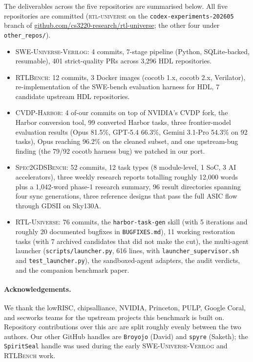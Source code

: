 \documentclass{article}
\begin{document}
The deliverables across the five repositories are summarised below. All five repositories
are committed (\textsc{rtl-universe} on the \texttt{codex-experiments-202605} branch of
\url{github.com/cs3220-research/rtl-universe}; the other four under
\texttt{other\_repos/}).

\begin{itemize}[nosep, leftmargin=*]
\item \textsc{SWE-Universe-Verilog}: 4 commits, 7-stage pipeline (Python, SQLite-backed,
resumable), 401 strict-quality PRs across 3{,}296 HDL repositories.
\item \textsc{RTLBench}: 12 commits, 3 Docker images (cocotb 1.x, cocotb 2.x, Verilator),
re-implementation of the SWE-bench evaluation harness for HDL, 7 candidate upstream HDL
repositories.
\item \textsc{CVDP-Harbor}: 4 of-our commits on top of NVIDIA's CVDP fork, the Harbor
conversion tool, 99 converted Harbor tasks, three frontier-model evaluation results
(Opus 81.5\%, GPT-5.4 66.3\%, Gemini 3.1-Pro 54.3\% on 92 tasks), Opus reaching 96.2\% on
the cleaned subset, and one upstream-bug finding (the 79/92 cocotb harness bug) we
patched in our port.
\item \textsc{Spec2GDSBench}: 52 commits, 12 task types (8 module-level, 1 SoC, 3 AI
accelerators), three weekly research reports totalling roughly 12{,}000 words plus a
1{,}042-word phase-1 research summary, 96 result directories spanning four sync
generations, three reference designs that pass the full ASIC flow through GDSII on
Sky130A.
\item \textsc{RTL-Universe}: 76 commits, the \texttt{harbor-task-gen} skill (with 5
iterations and roughly 20 documented bugfixes in \texttt{BUGFIXES.md}), 11 working
restoration tasks (with 7 archived candidates that did not make the cut), the multi-agent
launcher (\texttt{scripts/launcher.py}, 616 lines, with \texttt{launcher\_supervisor.sh}
and \texttt{test\_launcher.py}), the sandboxed-agent adapters, the audit verdicts, and
the companion benchmark paper.
\end{itemize}

\paragraph{Acknowledgements.} We thank the lowRISC, chipsalliance, NVIDIA, Princeton,
PULP, Google Coral, and secworks teams for the upstream projects this benchmark is built
on. Repository contributions over this arc are split roughly evenly between the two
authors. Our other GitHub handles are \texttt{Broyojo} (David) and \texttt{spyre}
(Saketh); the \texttt{SpiritSeal} handle was used during the early
\textsc{SWE-Universe-Verilog} and \textsc{RTLBench} work.


\end{document}
